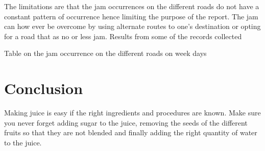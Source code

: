 \documentclass[options]{article}
\begin{document}
The limitations are that the jam occurrences on the different roads do not have a constant pattern of occurrence hence limiting the purpose of the report.
The jam can how ever be overcome by using alternate routes to one’s destination or opting for a road that as no or less jam.
Results from some of the records collected 


Table on the jam occurrence on the different roads on week days


\section{\textbf{Conclusion }} 
Making juice is easy if the right ingredients and procedures are known. Make sure you never
 forget adding sugar to the juice, removing the seeds of the different fruits so that they are
 not blended and finally adding the right quantity of water to the juice.
\end{document}
